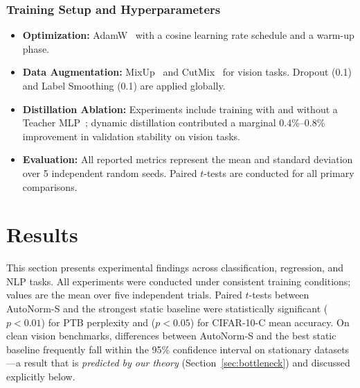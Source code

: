 \documentclass[final,3p,times,twocolumn]{elsarticle}
\begin{document}
\subsubsection{Training Setup and Hyperparameters}
\begin{itemize}
    \item \textbf{Optimization:} AdamW~\cite{loshchilov2019adamw} with a
      cosine learning rate schedule and a warm-up phase.
    \item \textbf{Data Augmentation:} MixUp~\cite{zhang2017mixup} and
      CutMix~\cite{yun2019cutmix} for vision tasks. Dropout (0.1) and
      Label Smoothing (0.1) are applied globally.
    \item \textbf{Distillation Ablation:} Experiments include training
      with and without a Teacher MLP~\cite{hinton2015distilling};
      dynamic distillation contributed a marginal 0.4\%--0.8\%
      improvement in validation stability on vision tasks.
    \item \textbf{Evaluation:} All reported metrics represent the mean
      and standard deviation over 5 independent random seeds. Paired
      $t$-tests are conducted for all primary comparisons.
      
\end{itemize}


\section{Results}
\label{sec:results}

This section presents experimental findings across classification,
regression, and NLP tasks. All experiments were conducted under
consistent training conditions; values are the mean over five
independent trials. Paired $t$-tests between AutoNorm-S and the
strongest static baseline were statistically significant ($p < 0.01$)
for PTB perplexity and ($p < 0.05$) for CIFAR-10-C mean accuracy. On
clean vision benchmarks, differences between AutoNorm-S and the best
static baseline frequently fall within the 95\% confidence interval on
stationary datasets---a result that is \textit{predicted by our
theory} (Section~\ref{sec:bottleneck}) and discussed explicitly below.
\end{document}
